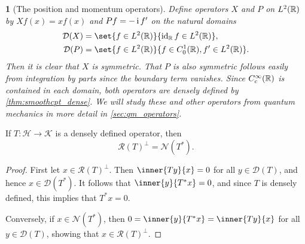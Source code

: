 \documentclass[article, a4paper, 11pt, oneside]{memoir}
\makeatletter
\numberwithin{equation}{chapter}
\newcommand{\calH}{\mathcal{H}}
\newcommand{\calK}{\mathcal{K}}
\newcommand{\dom}{\mathcal{D}}
\newcommand{\range}{\mathcal{R}}
\newcommand{\nullspace}{\mathcal{N}}
\theoremstyle{myexample}
\theoremstyle{myexample}
\theoremstyle{myexamplebreak}
\theoremstyle{myexamplebreak}
\newtheorem{examplebreak}[theorem]{\protect\@example}
\theoremstyle{nonumberplain}
\newtheorem{proof}{\protect\@proof}
\theoremstyle{MyNonumberplain}
\newcommand{\@example}{}
\newcommand{\@proof}{}
\renewcommand{\@example}{Example}%
\renewcommand{\@proof}{Proof}%
\renewcommand{\@example}{Eksempel}%
\renewcommand{\@proof}{Bevis}%
\makeatother
\begin{document}
\begin{examplebreak}[The position and momentum operators]
    \label{ex:position_momentum}
    Define operators $X$ and $P$ on $L^2(\mathbb{R})$ by $Xf(x) = xf(x)$ and $Pf = -\operatorname{i} f'$ on the natural domains
    \begin{align*}
        \dom(X) &= \set{ f \in L^2(\setR) }{ \id_\setR f \in L^2(\setR) }, \\
        \dom(P) &= \set{ f \in L^2(\setR) }{f \in C^1_0(\setR), f' \in L^2(\setR) }.
    \end{align*}
    Then it is clear that $X$ is symmetric. That $P$ is also symmetric follows easily from integration by parts since the boundary term vanishes. Since $C^\infty_c(\mathbb{R})$ is contained in each domain, both operators are densely defined by \cref{thm:smoothcpt_dense}. We will study these and other operators from quantum mechanics in more detail in \cref{sec:qm_operators}.
\end{examplebreak}

\begin{lemma}
    \label{thm:range_nullspace}
    If $T \colon \calH \to \calK$ is a densely defined operator, then
    \begin{equation*}
        \range(T)^\perp = \nullspace(T^*).
    \end{equation*}
\end{lemma}

\begin{proof}
    First let $x \in \range(T)^\perp$. Then $\inner{Ty}{x} = 0$ for all $y \in \dom(T)$, and hence $x \in \dom(T^*)$. It follows that $\inner{y}{T^*x} = 0$, and since $T$ is densely defined, this implies that $T^*x = 0$.
    
    Conversely, if $x \in \nullspace(T^*)$, then $0 = \inner{y}{T^*x} = \inner{Ty}{x}$ for all $y \in \dom(T)$, showing that $x \in \range(T)^\perp$.
\end{proof}

\end{document}
